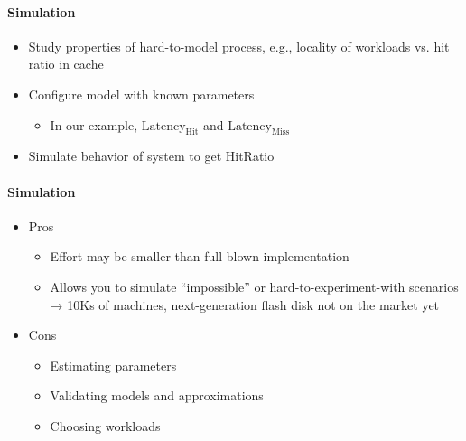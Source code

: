 \paragraph{Simulation}
\begin{itemize}
\item Study properties of hard-to-model process, e.g.,
  locality of workloads vs. hit ratio in cache
\item Configure model with known parameters
  \begin{itemize}
  \item In our example,
    {\color{blue} $\text{Latency}_{\text{Hit}}$} and
    {\color{blue} $\text{Latency}_{\text{Miss}}$}
  \end{itemize}

\item Simulate behavior of system to get {\color{orange} HitRatio}
\end{itemize}


\paragraph{Simulation}

\begin{itemize}
\item {\color{green} Pros}
  \begin{itemize}
  \item Effort may be smaller than full-blown implementation
  \item Allows you to simulate ``impossible'' or
    hard-to-experiment-with scenarios → 10Ks of machines,
    next-generation flash disk not on the market yet
  \end{itemize}
\end{itemize}

\begin{itemize}
\item {\color{red} Cons}
  \begin{itemize}
  \item Estimating parameters
  \item Validating models and approximations
  \item Choosing workloads
  \end{itemize}
\end{itemize}


